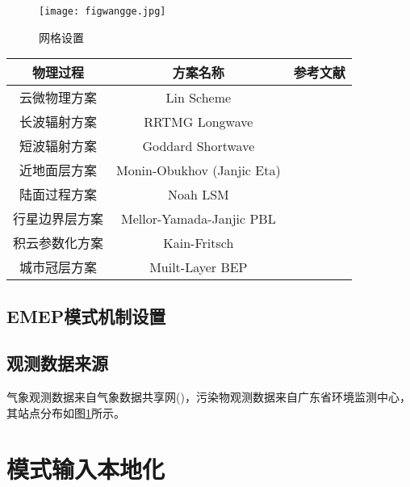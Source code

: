 \documentclass[a4paper]{article}
\begin{document}
\begin{figure}[!htb]
\centering\texttt{[image: figwangge.jpg]} 
\caption{网格设置}\label{wangge}
\end{figure} 

\begin{threeparttable}[!htb]\small%
\centering
\caption{WRF物理参数化方案}\label{physicsschemes}
\begin{tabular}{ccc}
\toprule 
物理过程 & 方案名称 & 参考文献 \\ %
\midrule
云微物理方案 & Lin Scheme & \citep{lin1983bulk} \\
长波辐射方案 & RRTMG Longwave & \citep{iacono2008radiative} \\
短波辐射方案 & Goddard Shortwave & \citep{chou2001thermal} \\
近地面层方案 & Monin-Obukhov (Janjic Eta) & \citep{janjic1994step} \\
陆面过程方案 & Noah LSM & \citep{mukul2004implementation} \\
行星边界层方案 & Mellor-Yamada-Janjic PBL & \citep{janjic1994step} \\
积云参数化方案 & Kain-Fritsch & \citep{kain1993convective} \\
城市冠层方案 & Muilt-Layer BEP & \citep{salamanca2010new} \\
\bottomrule
\end{tabular}
\end{threeparttable}

\subsection{EMEP模式机制设置}

\subsection{观测数据来源}
气象观测数据来自气象数据共享网(\url{})，污染物观测数据来自广东省环境监测中心，其站点分布如图\ref{}所示。


\section{模式输入本地化}
\end{document}
